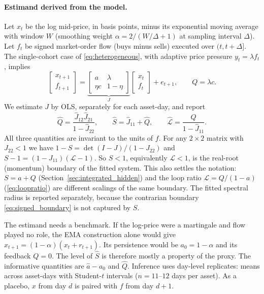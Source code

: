 \documentclass[10pt,twocolumn,letterpaper]{article}
\theoremstyle{definition}
\theoremstyle{remark}
\begin{document}
\paragraph{Estimand derived from the model.} Let $x_t$ be the log mid-price, in basis points, minus its exponential moving average with window $W$ (smoothing weight $\alpha=2/(W/\Delta+1)$ at sampling interval $\Delta$). Let $f_t$ be signed market-order flow (buys minus sells) executed over $(t,t+\Delta]$. The single-cohort case of \eqref{eq:heterogeneous}, with adaptive price pressure $y_t=\lambda f_t$, implies
\begin{equation}
 \begin{bmatrix}x_{t+1}\\ f_{t+1}\end{bmatrix}
 =\underbrace{\begin{bmatrix}a&\lambda\\ \eta c&1-\eta\end{bmatrix}}_{J}
 \begin{bmatrix}x_{t}\\ f_{t}\end{bmatrix}+e_{t+1},
 \qquad Q=\lambda c .
 \label{eq:empirical_var}
\end{equation}
We estimate $J$ by OLS, separately for each asset-day, and report
\begin{equation}
 \hat Q=\frac{\hat J_{12}\hat J_{21}}{1-\hat J_{22}},\qquad
 \hat S=\hat J_{11}+\hat Q,\qquad
 \hat{\mathcal L}=\frac{\hat Q}{1-\hat J_{11}} .
 \label{eq:empirical_S}
\end{equation}
All three quantities are invariant to the units of $f$. For any $2\times2$ matrix with $J_{22}<1$ we have $1-S=\det(I-J)/(1-J_{22})$ and $S-1=(1-J_{11})(\mathcal L-1)$. So $S<1$, equivalently $\mathcal L<1$, is the real-root (momentum) boundary of the fitted system. This also settles the notation: $S=a+Q$ (Section~\ref{sec:integrated_hidden}) and the loop ratio $\mathcal L=Q/(1-a)$ (\cref{eq:loopratio}) are different scalings of the same boundary. The fitted spectral radius is reported separately, because the contrarian boundary \eqref{eq:signed_boundary} is not captured by $S$.

The estimand needs a benchmark. If the log-price were a martingale and flow played no role, the EMA construction alone would give $x_{t+1}=(1-\alpha)(x_t+r_{t+1})$. Its persistence would be $a_0=1-\alpha$ and its feedback $Q=0$. The level of $\hat S$ is therefore mostly a property of the proxy. The informative quantities are $\hat a-a_0$ and $\hat Q$. Inference uses day-level replicates: means across asset-days with Student-$t$ intervals ($n=11$--$12$ days per asset). As a placebo, $x$ from day $d$ is paired with $f$ from day $d+1$.
\end{document}
